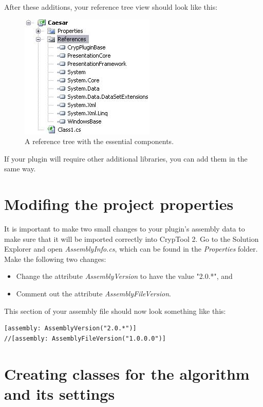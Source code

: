 \noindent After these additions, your reference tree view should look like this:

\begin{figure}[h!]
		\includegraphics{figures/reference_tree.jpg}
	\caption{A reference tree with the essential components.}
	\label{fig:reference_tree}
\end{figure}

\noindent If your plugin will require other additional libraries, you can add them in the same way.

\section{Modifing the project properties}
\label{sec:ModifyTheProjectProperties}

It is important to make two small changes to your plugin's assembly data to make sure that it will be imported correctly into CrypTool 2. Go to the Solution Explorer and open \textit{AssemblyInfo.cs}, which can be found in the \textit{Properties} folder. Make the following two changes:

\begin{itemize}
	\item Change the attribute \textit{AssemblyVersion} to have the value "2.0.*", and
	\item Comment out the attribute \textit{AssemblyFileVersion}.
\end{itemize}

\noindent This section of your assembly file should now look something like this:

\begin{lstlisting}
[assembly: AssemblyVersion("2.0.*")]
//[assembly: AssemblyFileVersion("1.0.0.0")]
\end{lstlisting}

\section{Creating classes for the algorithm and its settings}
\label{sec:CreatingClassesForTheAlgorithmAndItsSettings}


